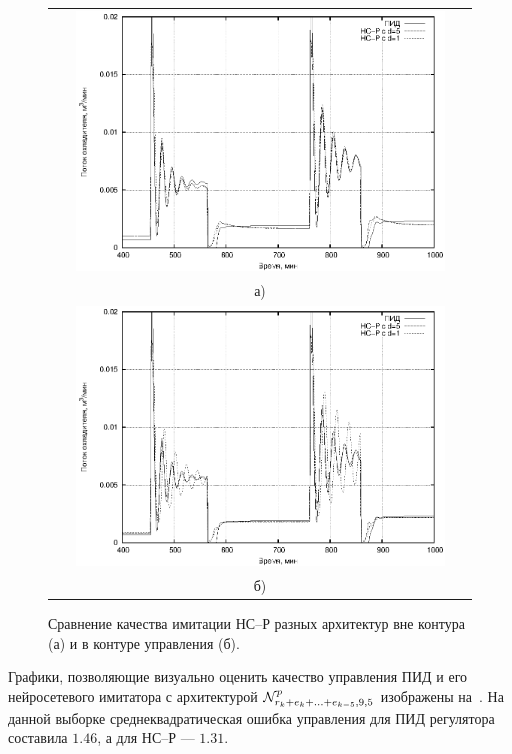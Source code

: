 \begin{figure}
  \centering
  \begin{tabular}{c}
    \includegraphics[width=0.9\textwidth,%
      totalheight=0.4\textheight]{cstr_e5r1_vs_e1r1_outloop_rus} \\
    а) \\
    \includegraphics[width=0.9\textwidth,%
      totalheight=0.4\textheight]{cstr_e5r1_vs_e1r1_inloop_rus} \\
    б)
  \end{tabular}
  \caption{Сравнение качества имитации НС--Р разных архитектур вне контура (а) и в контуре управления (б).}%
  \label{fig:cstr_e5r1_vs_e1r1_training}
\end{figure}

Графики, позволяющие визуально оценить качество управления ПИД и его
нейросетевого имитатора с архитектурой
$\mathcal{N}^p_{r_k+e_k+\ldots+e_{k-5},9,5}$ изображены
на~.  На данной выборке
среднеквадратическая ошибка управления для ПИД регулятора составила
$1.46$, а для НС--Р --- $1.31$.

